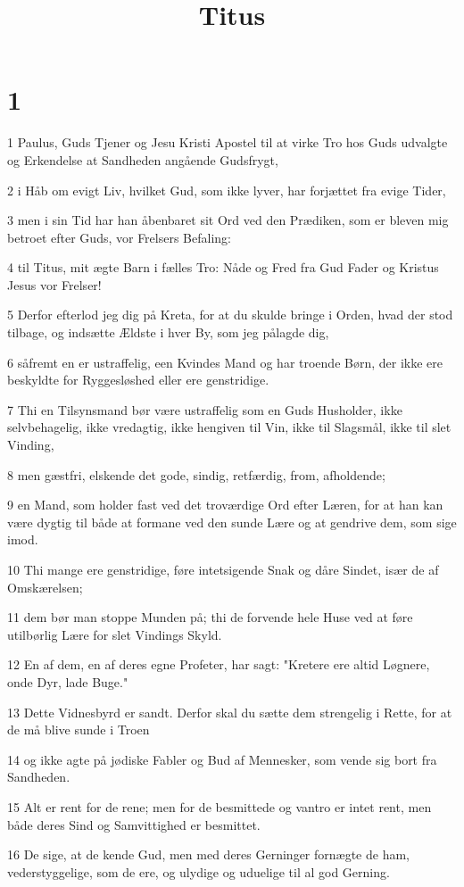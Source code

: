 

\title{Titus}


\chapter{1}

\par 1 Paulus, Guds Tjener og Jesu Kristi Apostel til at virke Tro hos Guds udvalgte og Erkendelse at Sandheden angående Gudsfrygt,
\par 2 i Håb om evigt Liv, hvilket Gud, som ikke lyver, har forjættet fra evige Tider,
\par 3 men i sin Tid har han åbenbaret sit Ord ved den Prædiken, som er bleven mig betroet efter Guds, vor Frelsers Befaling:
\par 4 til Titus, mit ægte Barn i fælles Tro: Nåde og Fred fra Gud Fader og Kristus Jesus vor Frelser!
\par 5 Derfor efterlod jeg dig på Kreta, for at du skulde bringe i Orden, hvad der stod tilbage, og indsætte Ældste i hver By, som jeg pålagde dig,
\par 6 såfremt en er ustraffelig, een Kvindes Mand og har troende Børn, der ikke ere beskyldte for Ryggesløshed eller ere genstridige.
\par 7 Thi en Tilsynsmand bør være ustraffelig som en Guds Husholder, ikke selvbehagelig, ikke vredagtig, ikke hengiven til Vin, ikke til Slagsmål, ikke til slet Vinding,
\par 8 men gæstfri, elskende det gode, sindig, retfærdig, from, afholdende;
\par 9 en Mand, som holder fast ved det troværdige Ord efter Læren, for at han kan være dygtig til både at formane ved den sunde Lære og at gendrive dem, som sige imod.
\par 10 Thi mange ere genstridige, føre intetsigende Snak og dåre Sindet, især de af Omskærelsen;
\par 11 dem bør man stoppe Munden på; thi de forvende hele Huse ved at føre utilbørlig Lære for slet Vindings Skyld.
\par 12 En af dem, en af deres egne Profeter, har sagt: "Kretere ere altid Løgnere, onde Dyr, lade Buge."
\par 13 Dette Vidnesbyrd er sandt. Derfor skal du sætte dem strengelig i Rette, for at de må blive sunde i Troen
\par 14 og ikke agte på jødiske Fabler og Bud af Mennesker, som vende sig bort fra Sandheden.
\par 15 Alt er rent for de rene; men for de besmittede og vantro er intet rent, men både deres Sind og Samvittighed er besmittet.
\par 16 De sige, at de kende Gud, men med deres Gerninger fornægte de ham, vederstyggelige, som de ere, og ulydige og uduelige til al god Gerning.

